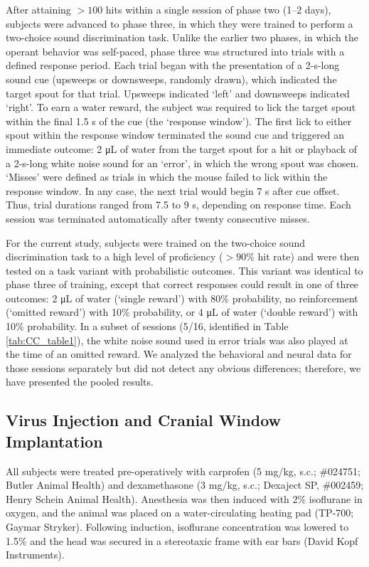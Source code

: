 After attaining $>100$ hits within a single session of phase two (1–2 days), subjects were advanced to phase three, in which they were trained to perform a two-choice sound discrimination task. Unlike the earlier two phases, in which the operant behavior was self-paced, phase three was structured into trials with a defined response period. Each trial began with the presentation of a 2-s-long sound cue (upsweeps or downsweeps, randomly drawn), which indicated the target spout for that trial. Upsweeps indicated ‘left’ and downsweeps indicated ‘right’. To earn a water reward, the subject was required to lick the target spout within the final 1.5 s of the cue (the ‘response window’). The first lick to either spout within the response window terminated the sound cue and triggered an immediate outcome: 2 \si{\uL} of water from the target spout for a hit or playback of a 2-s-long white noise sound for an ‘error’, in which the wrong spout was chosen. ‘Misses’ were defined as trials in which the mouse failed to lick within the response window. In any case, the next trial would begin 7 s after cue offset. Thus, trial durations ranged from 7.5 to 9 s, depending on response time. Each session was terminated automatically after twenty consecutive misses. 

For the current study, subjects were trained on the two-choice sound discrimination task to a high level of proficiency ($>90\%$ hit rate) and were then tested on a task variant with probabilistic outcomes. This variant was identical to phase three of training, except that correct responses could result in one of three outcomes: 2 \si{\uL} of water (‘single reward’) with 80\% probability, no reinforcement (‘omitted reward’) with 10\% probability, or 4 \si{\uL} of water (‘double reward’) with 10\% probability. In a subset of sessions (5/16, identified in Table \ref{tab:CC_table1}), the white noise sound used in error trials was also played at the time of an omitted reward. We analyzed the behavioral and neural data for those sessions separately but did not detect any obvious differences; therefore, we have presented the pooled results.



\subsection*{Virus Injection and Cranial Window Implantation}
All subjects were treated pre-operatively with carprofen (5 mg/kg, s.c.; \#024751; Butler Animal Health) and dexamethasone (3 mg/kg, s.c.; Dexaject SP, \#002459; Henry Schein Animal Health). Anesthesia was then induced with 2\% isoflurane in oxygen, and the animal was placed on a water-circulating heating pad (TP-700; Gaymar Stryker). Following induction, isoflurane concentration was lowered to 1.5\% and the head was secured in a stereotaxic frame with ear bars (David Kopf Instruments).

